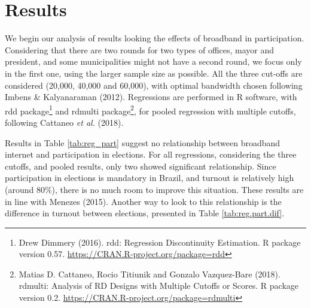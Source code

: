 \documentclass[12pt,]{article}
\let\rmarkdownfootnote\footnote%
\def\footnote{\protect\rmarkdownfootnote}
\begin{document}
\hypertarget{results}{%
\section{Results}\label{results}}

We begin our analysis of results looking the effects of broadband in
participation. Considering that there are two rounds for two types of
offices, mayor and president, and some municipalities might not have a
second round, we focus only in the first one, using the larger sample
size as possible. All the three cut-offs are considered (20,000, 40,000
and 60,000), with optimal bandwidth chosen following Imbens \&
Kalyanaraman (2012). Regressions are performed in R software, with rdd
package\footnote{Drew Dimmery (2016). rdd: Regression Discontinuity
  Estimation. R package version 0.57.
  \url{https://CRAN.R-project.org/package=rdd}} and rdmulti
package\footnote{Matias D. Cattaneo, Rocio Titiunik and Gonzalo
  Vazquez-Bare (2018). rdmulti: Analysis of RD Designs with Multiple
  Cutoffs or Scores. R package version 0.2.
  \url{https://CRAN.R-project.org/package=rdmulti}}, for pooled
regression with multiple cutoffs, following Cattaneo \emph{et al.}
(2018).

Results in Table \ref{tab:reg_part} suggest no relationship between
broadband internet and participation in elections. For all regressions,
considering the three cutoffs, and pooled results, only two showed
significant relationship. Since participation in elections is mandatory
in Brazil, and turnout is relatively high (around 80\%), there is no
much room to improve this situation. These results are in line with
Menezes (2015). Another way to look to this relationship is the
difference in turnout between elections, presented in Table
\ref{tab:reg.part.dif}.
\end{document}

